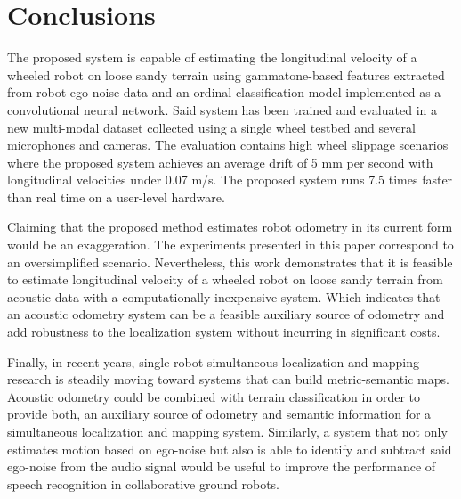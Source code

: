 \section{Conclusions} \label{chap:conclusions}


The proposed system is capable of estimating the longitudinal velocity of a
wheeled robot on loose sandy terrain using gammatone-based features extracted
from robot ego-noise data and an ordinal classification model implemented as a
convolutional neural network. Said system has been trained and evaluated in a
new multi-modal dataset collected using a single wheel testbed and several
microphones and cameras. The evaluation contains high wheel slippage scenarios
where the proposed system achieves an average drift of 5 mm per second with
longitudinal velocities under 0.07 m/s. The proposed system runs 7.5 times
faster than real time on a user-level hardware.


Claiming that the proposed method estimates robot odometry in its current form
would be an exaggeration. The experiments presented in this paper correspond to
an oversimplified scenario. Nevertheless, this work demonstrates that it is
feasible to estimate longitudinal velocity of a wheeled robot on loose sandy
terrain from acoustic data with a computationally inexpensive system. Which
indicates that an acoustic odometry system can be a feasible auxiliary source
of odometry and add robustness to the localization system without incurring in
significant costs. 



Finally, in recent years, single-robot simultaneous localization and mapping
research is steadily moving toward systems that can build metric-semantic maps.
Acoustic odometry could be combined with terrain classification in order to
provide both, an auxiliary source of odometry and semantic information for a
simultaneous localization and mapping system. Similarly, a system that not only
estimates motion based on ego-noise but also is able to identify and subtract
said ego-noise from the audio signal would be useful to improve the performance
of speech recognition in collaborative ground robots. 